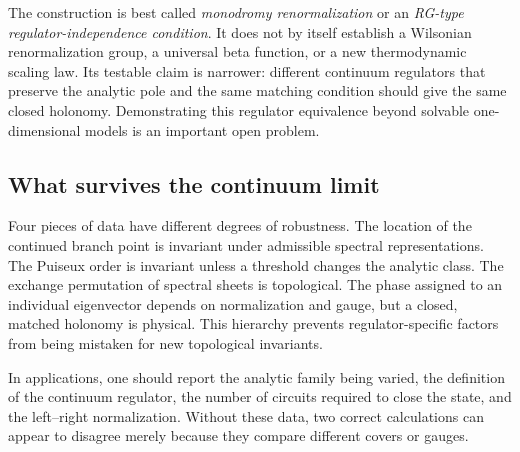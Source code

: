 The construction is best called \textit{monodromy renormalization} or an
\textit{RG-type regulator-independence condition}.  It does not by itself
establish a Wilsonian renormalization group, a universal beta function, or a
new thermodynamic scaling law.  Its testable claim is narrower: different
continuum regulators that preserve the analytic pole and the same matching
condition should give the same closed holonomy.  Demonstrating this regulator
equivalence beyond solvable one-dimensional models is an important open
problem.

\subsection{What survives the continuum limit}
\label{subsec:ep-universal-data}

Four pieces of data have different degrees of robustness.  The location of
the continued branch point is invariant under admissible spectral
representations.  The Puiseux order is invariant unless a threshold changes
the analytic class.  The exchange permutation of spectral sheets is
topological.  The phase assigned to an individual eigenvector depends on
normalization and gauge, but a closed, matched holonomy is physical.  This
hierarchy prevents regulator-specific factors from being mistaken for new
topological invariants.

In applications, one should report the analytic family being varied, the
definition of the continuum regulator, the number of circuits required to
close the state, and the left--right normalization.  Without these data, two
  correct calculations can appear to disagree merely because they compare
  different covers or gauges.
